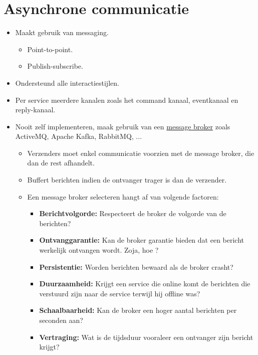 	\section{Asynchrone communicatie}
	\begin{itemize}
		\item Maakt gebruik van messaging.
		\begin{itemize}
			\item Point-to-point.
			\item Publish-subscribe.
		\end{itemize}
		\item[\good] Ondersteund alle interactiestijlen.
		\item Per service meerdere kanalen zoals het command kanaal, eventkanaal en reply-kanaal.
		\item Nooit zelf implementeren, maak gebruik van een \uline{message broker} zoals ActiveMQ, Apache Kafka, RabbitMQ, ... 
		\begin{itemize}
			\item[\good] Verzenders moet enkel communicatie voorzien met de message broker, die dan de rest afhandelt.
			\item[\good] Buffert berichten indien de ontvanger trager is dan de verzender.
			\item Een message broker selecteren hangt af van volgende factoren:
			\begin{itemize}
				\item \textbf{Berichtvolgorde:} Respecteert de broker de volgorde van de berichten?
				\item \textbf{Ontvanggarantie:} Kan de broker garantie bieden dat een bericht werkelijk ontvangen wordt. Zoja, hoe ?
				\item \textbf{Persistentie:} Worden berichten bewaard als de broker crasht?
				\item \textbf{Duurzaamheid:} Krijgt een service die online komt de berichten die verstuurd zijn naar de service terwijl hij offline was?
				\item \textbf{Schaalbaarheid:} Kan de broker een hoger aantal berichten per seconden aan?
				\item \textbf{Vertraging:} Wat is de tijdsduur vooraleer een ontvanger zijn bericht krijgt?
			\end{itemize}
		\end{itemize}

	\end{itemize}
